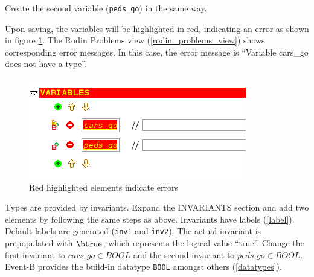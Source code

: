 Create the second variable (\texttt{peds\_go}) in the same way.


Upon saving, the variables will be highlighted in red, indicating an error as shown in figure \ref{fig_tut_03_error}.  The \textsf{Rodin Problems} view (\ref{rodin_problems_view}) shows corresponding error messages. In this case, the error message is ``Variable cars\_go does not have a type''.

\begin{figure}[!h]
\begin{center}
	\includegraphics[]{img/tutorial/tut_03_error.png}
	\caption{Red highlighted elements indicate errors}
	\label{fig_tut_03_error}
\end{center}
\end{figure}

Types are provided by invariants. Expand the \textsf{INVARIANTS} section and add two elements by following the same steps as above.  Invariants have labels (\ref{label}).  Default labels are generated (\texttt{inv1} and \texttt{inv2}).  The actual invariant is prepopulated with $\btrue$, which represents the logical value ``true''.  Change the first invariant to $cars\_go \in  BOOL$ and the second invariant to $peds\_go \in  BOOL$.  Event-B provides the build-in datatype \texttt{BOOL} amongst others (\ref{datatypes}).



